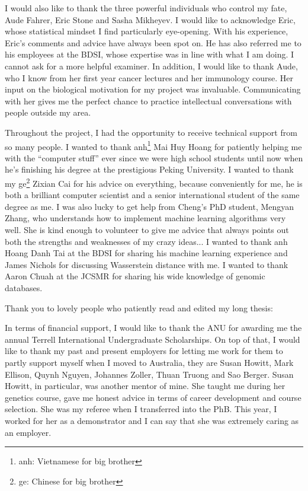 I would also like to thank the three powerful individuals who control my fate, Aude Fahrer, Eric Stone and Sasha Mikheyev. I would like to acknowledge Eric, whose statistical mindset I find particularly eye-opening. With his experience, Eric's comments and advice have always been spot on. He has also referred me to his employees at the BDSI, whose expertise was in line with what I am doing. I cannot ask for a more helpful examiner. In addition, I would like to thank Aude, who I know from her first year cancer lectures and her immunology course. Her input on the biological motivation for my project was invaluable. Communicating with her gives me the perfect chance to practice intellectual conversations with people outside my area.

Throughout the project, I had the opportunity to receive technical support from so many people. I wanted to thank anh\footnote{anh: Vietnamese for big brother} Mai Huy Hoang for patiently helping me with the ``computer stuff'' ever since we were high school students until now when he's finishing his degree at the prestigious Peking University. I wanted to thank my ge\footnote{ge: Chinese for big brother} Zixian Cai for his advice on everything, because conveniently for me, he is both a brilliant computer scientist and a senior international student of the same degree as me. I was also lucky to get help from Cheng's PhD student, Mengyan Zhang, who understands how to implement machine learning algorithms very well. She is kind enough to volunteer to give me advice that always points out both the strengths and weaknesses of my crazy ideas... I wanted to thank anh Hoang Danh Tai at the BDSI for sharing his machine learning experience and James Nichols for discussing Wasserstein distance with me. I wanted to thank Aaron Chuah at the JCSMR for sharing his wide knowledge of genomic databases. 

Thank you to lovely people who patiently read and edited my long thesis: 

In terms of financial support, I would like to thank the ANU for awarding me the annual Terrell International Undergraduate Scholarships. On top of that, I would like to thank my past and present employers for letting me work for them to partly support myself when I moved to Australia, they are Susan Howitt, Mark Ellison, Quynh Nguyen, Johannes Zoller, Thuan Truong and Sao Berger. Susan Howitt, in particular, was another mentor of mine. She taught me during her genetics course, gave me honest advice in terms of career development and course selection. She was my referee when I transferred into the PhB. This year, I worked for her as a demonstrator and I can say that she was extremely caring as an employer. 

